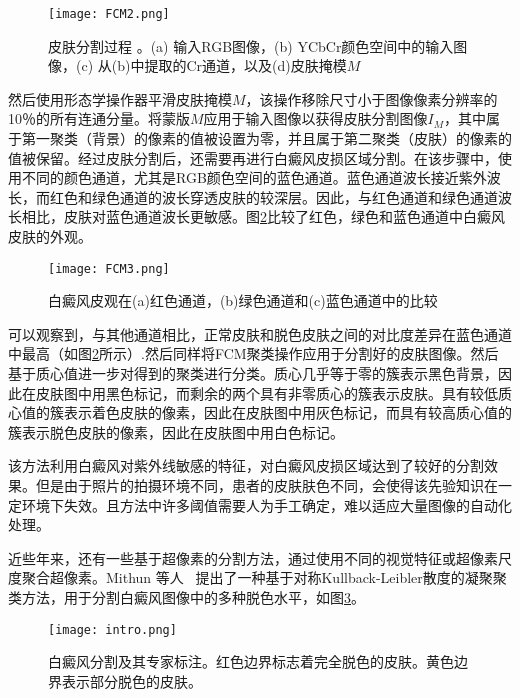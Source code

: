 \begin{figure}[htbp]
\begin{center}
\texttt{[image: FCM2.png]}
\end{center}
\caption{皮肤分割过程 \cite {nurhudatiana2015computer}。(a) 输入RGB图像，(b) YCbCr颜色空间中的输入图像，(c) 从(b)中提取的Cr通道，以及(d)皮肤掩模$M$}
\label{fig:FCM2}
\end{figure}

然后使用形态学操作器平滑皮肤掩模$M$，该操作移除尺寸小于图像像素分辨率的10％的所有连通分量。将蒙版$M$应用于输入图像以获得皮肤分割图像$I_M$，其中属于第一聚类（背景）的像素的值被设置为零，并且属于第二聚类（皮肤）的像素的值被保留。经过皮肤分割后，还需要再进行白癜风皮损区域分割。在该步骤中，使用不同的颜色通道，尤其是RGB颜色空间的蓝色通道。蓝色通道波长接近紫外波长，而红色和绿色通道的波长穿透皮肤的较深层。因此，与红色通道和绿色通道波长相比，皮肤对蓝色通道波长更敏感。图\ref{fig:FCM3}比较了红色，绿色和蓝色通道中白癜风皮肤的外观。

\begin{figure}[htbp]
\begin{center}
\texttt{[image: FCM3.png]}
\end{center}
\caption{白癜风皮观在(a)红色通道，(b)绿色通道和(c)蓝色通道中的比较 \cite {nurhudatiana2015computer}}
\label{fig:FCM3}
\end{figure}

可以观察到，与其他通道相比，正常皮肤和脱色皮肤之间的对比度差异在蓝色通道中最高（如图\ref{fig:FCM3}所示）.然后同样将FCM聚类操作应用于分割好的皮肤图像。然后基于质心值进一步对得到的聚类进行分类。质心几乎等于零的簇表示黑色背景，因此在皮肤图中用黑色标记，而剩余的两个具有非零质心的簇表示皮肤。具有较低质心值的簇表示着色皮肤的像素，因此在皮肤图中用灰色标记，而具有较高质心值的簇表示脱色皮肤的像素，因此在皮肤图中用白色标记。

该方法利用白癜风对紫外线敏感的特征，对白癜风皮损区域达到了较好的分割效果。但是由于照片的拍摄环境不同，患者的皮肤肤色不同，会使得该先验知识在一定环境下失效。且方法中许多阈值需要人为手工确定，难以适应大量图像的自动化处理。

近些年来，还有一些基于超像素的分割方法，通过使用不同的视觉特征或超像素尺度聚合超像素。Mithun 等人~ \cite {das2015kl}提出了一种基于对称Kullback-Leibler散度的凝聚聚类方法，用于分割白癜风图像中的多种脱色水平，如图\ref{fig:KL1}。

\begin{figure}[htbp]
\begin{center}
\texttt{[image: intro.png]}
\end{center}
\caption{⽩癜风分割及其专家标注\cite {das2015kl}。红⾊边界标志着完全脱⾊的⽪肤。黄⾊边界表⽰部分脱⾊的⽪肤。}
\label{fig:KL1}
\end{figure}

